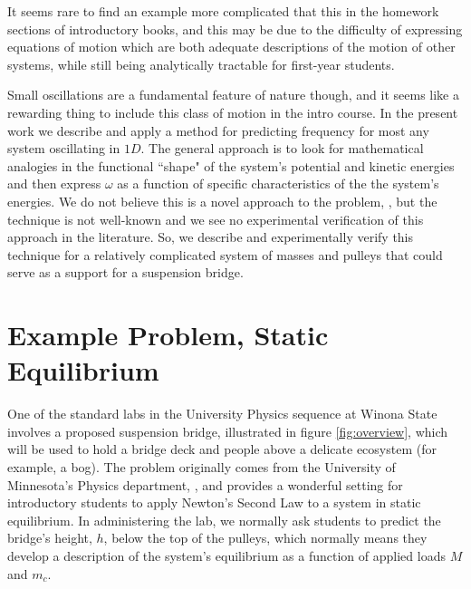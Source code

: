 \documentclass[12pt]{iopart}
\begin{document}
It seems rare  to find an example more complicated that this in the homework sections of introductory books, and this may be due to the difficulty of expressing equations of motion which are both adequate descriptions of the motion of other systems, while still being analytically tractable for first-year students.

Small oscillations are a fundamental feature of nature though, and it seems like a rewarding thing to include this class of motion in the intro course.  In the present work we describe and apply a method for predicting frequency for most any system oscillating in $1D$.  The general approach is to look for mathematical analogies in the functional ``shape" of the system's potential and kinetic energies and then express $\omega$ as a function of specific characteristics of the the system's energies.  We do not believe this is a novel approach to the problem, \cite{bayman_hammermesh}, but the technique is not well-known and we see no experimental verification of this approach in the literature. So, we describe and experimentally verify this technique for a relatively  complicated system of masses and pulleys that could serve as a support for a suspension bridge.  

\section{Example Problem, Static Equilibrium}
One of the standard labs in the University Physics sequence at Winona State involves a proposed suspension bridge, illustrated in figure \ref{fig:overview}, which will be used to hold a bridge deck and people above a delicate ecosystem (for example, a bog).  The problem originally comes from the University of Minnesota's Physics department, \cite{UofMN_Lab_manual}, and provides a wonderful setting for introductory students to apply Newton's Second Law to a system in  static equilibrium.  In administering the lab, we normally ask students to predict the bridge's height, $h$, below the top of the pulleys, which normally means they develop a description of the system's equilibrium as a function of applied loads $M$ and $m_c$.  
\end{document}

